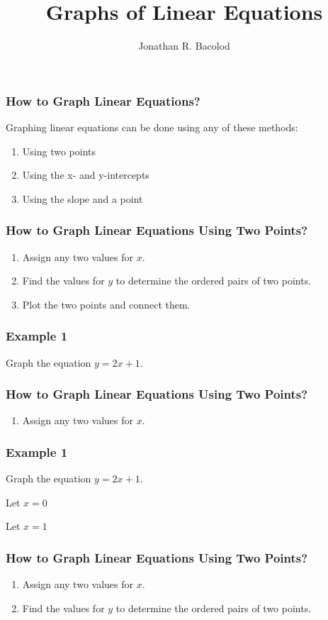\documentclass[14pt]{beamer}
\title[] {Graphs of Linear Equations}
\author{Jonathan R. Bacolod}
\institute[SHS]{Sauyo High School}
\date{}
\begin{document}
	\frame{\titlepage}
	
	\begin{frame}
		\frametitle{How to Graph Linear Equations?}
		Graphing linear equations can be done using any of these methods: 
		\begin{enumerate}  
			\item \pause Using two points 
			\item \pause Using the x- and  y-intercepts
			\item \pause Using the slope  and a point
		\end{enumerate}  
	\end{frame}

    \begin{frame}
    	\frametitle{How to Graph Linear Equations Using Two Points?}
    	\begin{enumerate}  
    		\item Assign any two values for $ x $.
    		\item \pause Find the values for $ y $ to determine the ordered pairs of two points.
    		\item \pause Plot the two points and connect them.
    	\end{enumerate}  
    \end{frame}

    \begin{frame}
    	\frametitle{Example 1}
    	Graph the equation $ y = 2x + 1 $.
    \end{frame}

    \begin{frame}
    	\frametitle{How to Graph Linear Equations Using Two Points?}
    	\begin{enumerate}  
    		\item Assign any two values for $ x $.
    	\end{enumerate}  
    \end{frame}

    \begin{frame}
    	\frametitle{Example 1}
    	Graph the equation $ y = 2x + 1 $.
    	
    	\pause \vone Let $ x = 0 $
    	
    	\vone \pause Let $ x = 1 $
    \end{frame}

    \begin{frame}
    	\frametitle{How to Graph Linear Equations Using Two Points?}
    	\begin{enumerate}  
    		\item Assign any two values for $ x $.
    		\item Find the values for $ y $ to determine the ordered pairs of two points.
    	\end{enumerate}  
    \end{frame}
\end{document}
